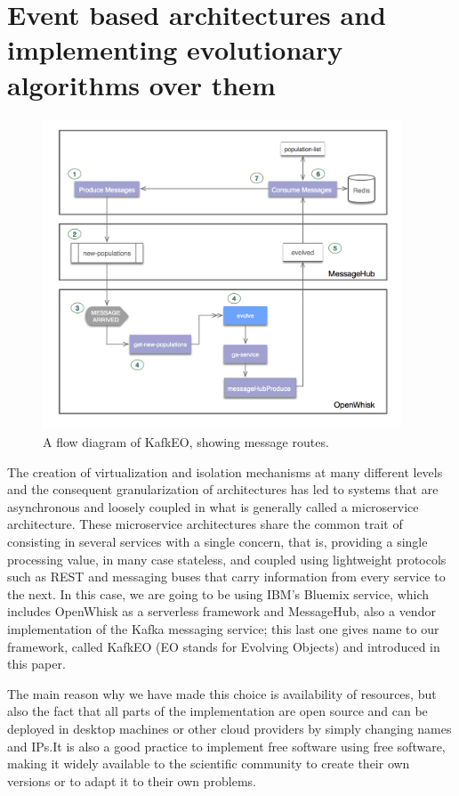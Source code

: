 \documentclass[sigconf]{acmart}
\begin{document}
\section{Event based architectures and implementing evolutionary
  algorithms over them}
\label{sec:methods}
%
\begin{figure}[h!tbp]
\includegraphics[width=0.95\textwidth]{img/kafka.png}
\caption{A flow diagram of KafkEO, showing message routes.}
\label{fig:kafkeo}
\end{figure}
%
The creation of virtualization and isolation mechanisms at many
different levels and the consequent granularization of architectures
has led to systems that are asynchronous and loosely coupled in what
is generally called a microservice architecture. These microservice
architectures share the common trait of consisting in several services
with a single concern, that is, providing a single processing value,
in many case stateless, and coupled using lightweight protocols such
as REST and messaging buses that carry information from every service
to the next. In this case, we are going to be using IBM's Bluemix
service, which includes OpenWhisk as a serverless framework and
MessageHub, also a vendor implementation of the Kafka messaging
service; this last one gives name to our framework, called KafkEO (EO
stands for Evolving Objects) and introduced in this paper.

The main reason why we have made this choice is availability of
resources, but also
the fact that all parts of the implementation are open source and can
be deployed in desktop machines or other cloud providers by simply
changing names and IPs.It is also a good practice to implement free
software using free software, making it widely available to the
scientific community to create their own versions or to adapt it to
their own problems.
\end{document}
